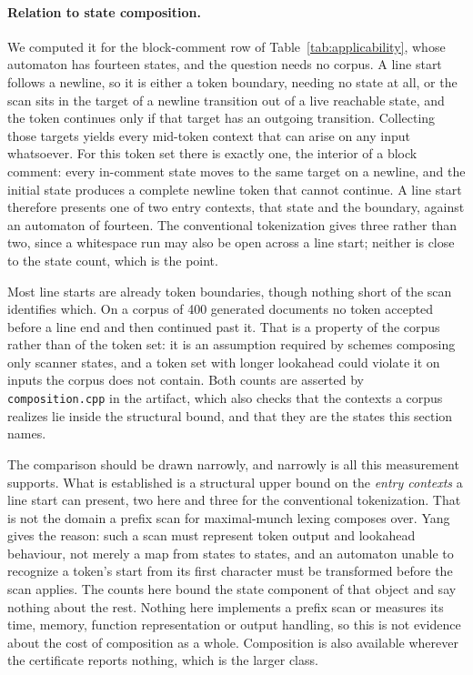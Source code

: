 \documentclass[11pt,a4paper]{article}
\theoremstyle{definition}
\theoremstyle{plain}
\newcommand{\code}[1]{\texttt{#1}}
\begin{document}
\paragraph{Relation to state composition.} We computed it for the block-comment row of Table~\ref{tab:applicability},
whose automaton has fourteen states, and the question needs no corpus. A line start follows a newline, so it is either
a token boundary, needing no state at all, or the scan sits in the target of a newline transition out of a live
reachable state, and the token continues only if that target has an outgoing transition. Collecting those targets
yields every mid-token context that can arise on any input whatsoever. For this token set there is exactly one, the
interior of a block comment: every in-comment state moves to the same target on a newline, and the initial state
produces a complete newline token that cannot continue. A line start therefore presents one of two entry contexts,
that state and the boundary, against an automaton of fourteen. The conventional tokenization gives three rather than
two, since a whitespace run may also be open across a line start; neither is close to the state count, which is the
point.

Most line starts are already token boundaries, though nothing short of the scan identifies which. On a corpus of 400
generated documents no token accepted before a line end and then continued past it. That is a property of the corpus
rather than of the token set: it is an assumption required by schemes composing only scanner states, and a token set
with longer lookahead could violate it on inputs the corpus does not contain. Both counts are asserted by
\code{composition.cpp} in the artifact, which also checks that the contexts a corpus realizes lie inside the
structural bound, and that they are the states this section names.

The comparison should be drawn narrowly, and narrowly is all this measurement supports. What is established is a
structural upper bound on the \emph{entry contexts} a line start can present, two here and three for the conventional
tokenization. That is not the domain a prefix scan for maximal-munch lexing composes over. Yang~\cite{yang1996mealy}
gives the reason: such a scan must represent token output and lookahead behaviour, not merely a map from states to
states, and an automaton unable to recognize a token's start from its first character must be transformed before the
scan applies. The counts here bound the state component of that object and say nothing about the rest. Nothing here
implements a prefix scan or measures its time, memory, function representation or output handling, so this is not
evidence about the cost of composition as a whole. Composition is also available wherever the certificate reports
nothing, which is the larger class.
\end{document}
